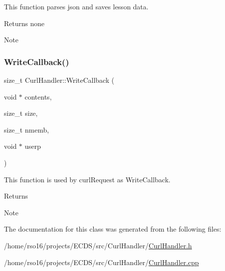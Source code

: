 This function parses json and saves lesson data. 

\begin{DoxyReturn}{Returns}
none 
\end{DoxyReturn}
\begin{DoxyNote}{Note}

\end{DoxyNote}
\mbox{\label{classCurlHandler_aff816fc825c4ad52b377c808a900d07d}} 
\subsubsection{\texorpdfstring{Write\+Callback()}{WriteCallback()}}
{\footnotesize\ttfamily size\+\_\+t Curl\+Handler\+::\+Write\+Callback (\begin{DoxyParamCaption}\item[{void $\ast$}]{contents,  }\item[{size\+\_\+t}]{size,  }\item[{size\+\_\+t}]{nmemb,  }\item[{void $\ast$}]{userp }\end{DoxyParamCaption})\hspace{0.3cm}{\ttfamily [static]}}



This function is used by curl\+Request as Write\+Callback. 

\begin{DoxyReturn}{Returns}

\end{DoxyReturn}
\begin{DoxyNote}{Note}

\end{DoxyNote}


The documentation for this class was generated from the following files\+:\begin{DoxyCompactItemize}
\item 
/home/rso16/projects/\+E\+C\+D\+S/src/\+Curl\+Handler/\hyperlink{CurlHandler_8h}{Curl\+Handler.\+h}\item 
/home/rso16/projects/\+E\+C\+D\+S/src/\+Curl\+Handler/\hyperlink{CurlHandler_8cpp}{Curl\+Handler.\+cpp}\end{DoxyCompactItemize}
